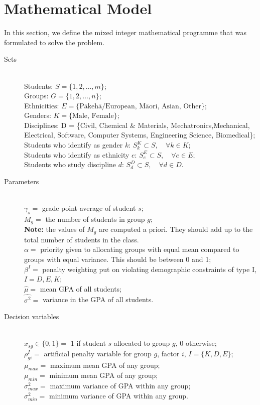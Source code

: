 \documentclass[12pt]{ORSNZ}
\begin{document}
\section{Mathematical Model}
In this section, we define the mixed integer mathematical programme that was formulated to solve the problem.
\begin{description}
\item[Sets] \mbox{}\\
        Students: $S = \{1, 2, \dots, m\}$;\\
        Groups: $G = \{1, 2, \dots, n\}$;\\
        Ethnicities: $E = \{\mbox{P\=akeh\=a/European, M\=aori, Asian, Other}\}$;\\
        Genders: $K = \{\mbox{Male, Female}\}$;\\
        Disciplines: D = \{Civil, Chemical \& Materials, Mechatronics,Mechanical, Electrical, Software, Computer Systems, Engineering Science, Biomedical\};
        Students who identify as gender $k$: $S^K_k \subset S, \quad \forall k \in K$;\\
        Students who identify as ethnicity $e$: $S^E_e \subset S, \quad \forall e \in E$;\\
        Students who study discipline $d$: $S^D_d \subset S, \quad \forall d \in D$.



\item[Parameters] \mbox{} \\
$\gamma_s = $ grade point average of student $s$; \\
$M_g = $ the number of students in group $g$;\\
\textbf{Note:} the values of $M_g$ are computed a priori. They should add up to the total number of students in the class.\\
$\alpha = $ priority given to allocating groups with equal mean compared to groups with equal variance. This should be between 0 and 1;\\
$\beta^I = $ penalty weighting put on violating demographic constraints of type I, $I= D, E, K$;\\
$\hat{\mu} = $ mean GPA of all students;\\
$\hat{\sigma^2} = $ variance in the GPA of all students.

\item[Decision variables]\mbox{} \\
$x_{sg}\in\{0,1\} = $ 1 if student $s$ allocated to group $g$, 0 otherwise;\\
$\rho^I_{gi} = $ artificial penalty variable for group $g$, factor $i$, \qquad $I=\{K, D, E\}$;\\
$\mu_{max} = $ maximum mean GPA of any group;\\
$\mu_{min} = $ minimum mean GPA of any group;\\
$\sigma^2_{max} = $ maximum variance of GPA within any group;\\
$\sigma^2_{min} = $  minimum variance of GPA within any group.


\end{description}
\end{document}
